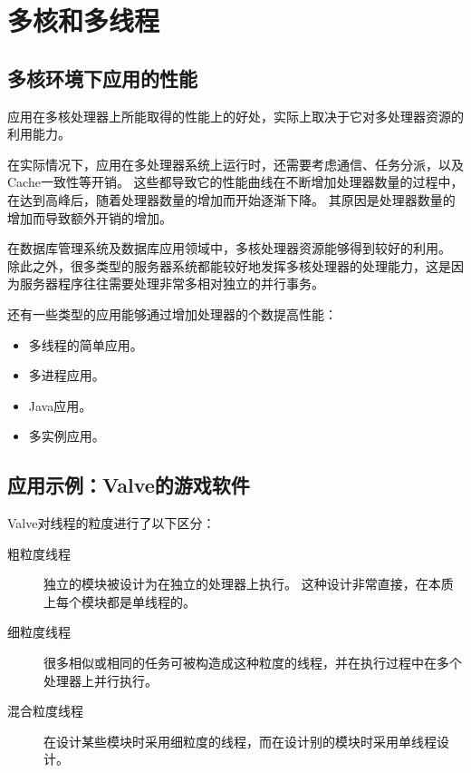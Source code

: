 
\section{多核和多线程}
{
    \subsection{多核环境下应用的性能}
    {
        应用在多核处理器上所能取得的性能上的好处，实际上取决于它对多处理器资源的利用能力。

        在实际情况下，应用在多处理器系统上运行时，还需要考虑通信、任务分派，以及Cache一致性等开销。
        这些都导致它的性能曲线在不断增加处理器数量的过程中，在达到高峰后，随着处理器数量的增加而开始逐渐下降。
        其原因是处理器数量的增加而导致额外开销的增加。

        在数据库管理系统及数据库应用领域中，多核处理器资源能够得到较好的利用。
        除此之外，很多类型的服务器系统都能较好地发挥多核处理器的处理能力，这是因为服务器程序往往需要处理非常多相对独立的并行事务。

        还有一些类型的应用能够通过增加处理器的个数提高性能：

        \begin{itemize}
            \item 多线程的简单应用。
            \item 多进程应用。
            \item Java应用。
            \item 多实例应用。
        \end{itemize}
    }

    \subsection{应用示例：Valve的游戏软件}
    {
        Valve对线程的粒度进行了以下区分：

        \begin{description}
            \item[粗粒度线程]
            {
                独立的模块被设计为在独立的处理器上执行。
                这种设计非常直接，在本质上每个模块都是单线程的。
            }
            \item[细粒度线程]
            {
                很多相似或相同的任务可被构造成这种粒度的线程，并在执行过程中在多个处理器上并行执行。
            }
            \item[混合粒度线程]
            {
                在设计某些模块时采用细粒度的线程，而在设计别的模块时采用单线程设计。
            }
        \end{description}
    }
}
